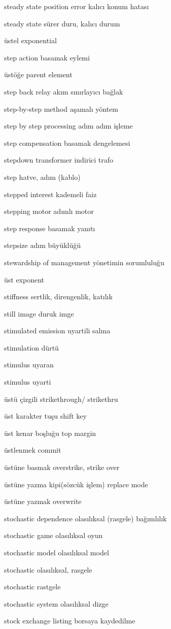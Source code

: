 \documentclass[12pt,fleqn]{article}\usepackage{../../common}
\begin{document}
steady state position error kalıcı konum hatası

steady state sürer duru, kalıcı durum

üstel exponential

step action basamak eylemi

üstöğe parent element

step back relay akım sınırlayıcı bağlak

step-by-step method aşamalı yöntem

step by step processing adım adım işleme

step compensation basamak dengelemesi

stepdown transformer indirici trafo

step hatve, adım (kablo)

stepped interest kademeli faiz

stepping motor adımlı motor

step response basamak yanıtı

stepsize adım büyüklüğü

stewardship of management yönetimin sorumluluğu

üst exponent

stiffness sertlik, direngenlik, katılık

still image duruk imge

stimulated emission uyartili salma

stimulation dürtü

stimulus uyaran

stimulus uyarti

üstü çizgili strikethrough/ strikethru

üst karakter tuşu shift key

üst kenar boşluğu top margin

üstlenmek commit

üstüne basmak overstrike, strike over

üstüne yazma kipi(sözcük işlem) replace mode

üstüne yazmak overwrite

stochastic dependence olasılıksal (rasgele) bağımlılık

stochastic game olasılıksal oyun

stochastic model olasılıksal model

stochastic olasılıksal, rasgele

stochastic rastgele

stochastic system olasılıksal dizge

stock exchange listing borsaya kaydedilme
\end{document}
